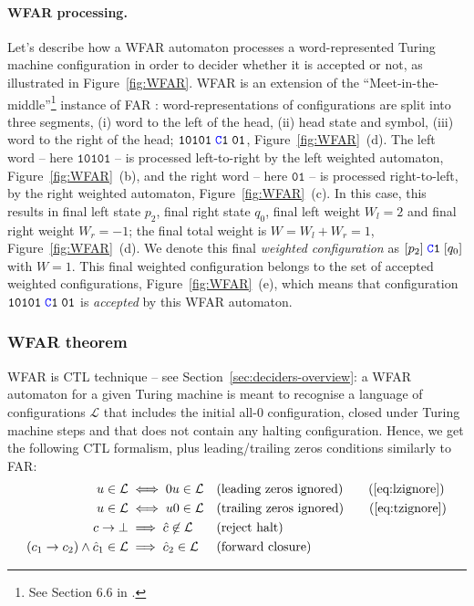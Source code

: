 \paragraph{WFAR processing.} Let's describe how a WFAR automaton processes a word-represented Turing machine configuration in order to decider whether it is accepted or not, as illustrated in Figure~\ref{fig:WFAR}. WFAR is an extension of the ``Meet-in-the-middle''\footnote{See Section 6.6 in \cite{bbchallenge_part1}.} instance of FAR \cite{bbchallenge_part1}: word-representations of configurations are split into three segments, (i) word to the left of the head, (ii) head state and symbol, (iii) word to the right of the head; \eg $\texttt{10101}\; \texttt{\stateC}\sone\; \texttt{01}$, Figure~\ref{fig:WFAR}~(d). The left word -- here $\texttt{10101}$ -- is processed left-to-right by the left weighted automaton, Figure~\ref{fig:WFAR}~(b), and the right word -- here $\texttt{01}$ -- is processed right-to-left, by the right weighted automaton, Figure~\ref{fig:WFAR}~(c). In this case, this results in final left state $p_2$, final right state $q_0$, final left weight $W_l = 2$ and final right weight $W_r = -1$; the final total weight is $W = W_l + W_r = 1$, Figure~\ref{fig:WFAR}~(d). We denote this final \textit{weighted configuration} as $[p_2]\; \texttt{\stateC}\sone\; [q_0]$ with $W=1$. This final weighted configuration belongs to the set of accepted weighted configurations, Figure~\ref{fig:WFAR}~(e), which means that configuration $\texttt{10101}\; \texttt{\stateC}\sone\; \texttt{01}$ is \textit{accepted} by this WFAR automaton.


\subsubsection{WFAR theorem}

WFAR is CTL technique -- see Section~\ref{sec:deciders-overview}: a WFAR automaton for a given Turing machine is meant to recognise a language of configurations $\mathcal{L}$ that includes the initial all-0 configuration, closed under Turing machine steps and that does not contain any halting configuration. Hence, we get the following CTL formalism, plus leading/trailing zeros conditions similarly to FAR:
\begin{align}
    u \in \mathcal{L}                               & \iff 0u \in \mathcal{L}               &  & \text{(leading zeros ignored)}
    \tag{\ref{eq:lzignore}}
    \\
    u \in \mathcal{L}                               & \iff u0 \in \mathcal{L}               &  & \text{(trailing zeros ignored)}
    \tag{\ref{eq:tzignore}}
    \\
    c\TMstep\bot                                    & \implies \hat{c} \not \in \mathcal{L} &  & \text{(reject halt)} \label{eq:rejecthalt}     \\
    (c_1\TMstep c_2)\land \hat{c}_1 \in \mathcal{L} & \implies\hat{c}_2 \in \mathcal{L}     &  & \text{(forward closure)} \label{eq:forwardclo}
\end{align}


